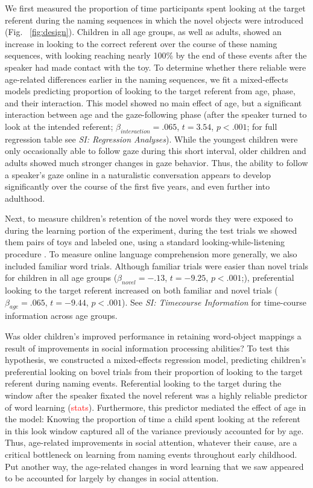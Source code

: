 \documentclass{pnastwo}
\newcommand{\red}[1]{\textcolor{red}{#1}}
\begin{document}
\begin{article}
We first measured the proportion of time participants spent looking at the target referent during the naming sequences in which the novel objects were introduced (Fig. ~\ref{fig:design}). Children in all age groups, as well as adults, showed an increase in looking to the correct referent over the course of these naming sequences, with looking reaching nearly 100\% by the end of these events after the speaker had made contact with the toy. To determine whether there reliable were age-related differences earlier in the naming sequences, we fit a mixed-effects models predicting proportion of looking to the target referent from age, phase, and their interaction. This model showed no main effect of age, but a significant interaction between age and the gaze-following phase (after the speaker turned to look at the intended referent; $\beta_{interaction} = .065$, $t = 3.54$, $p <.001$; for full regression table see \emph{SI: Regression Analyses}). While the youngest children were only occasionally able to follow gaze during this short interval, older children and adults showed much stronger changes in gaze behavior. Thus, the ability to follow a speaker's gaze online in a naturalistic conversation appears to develop significantly over the course of the first five years, and even further into adulthood.

Next, to measure children's retention of the novel words they were exposed to during the learning portion of the experiment, during the test trials we showed them pairs of toys and labeled one, using a standard looking-while-listening procedure \cite{fernald1998,fernald2008}. To measure online language comprehension more generally, we also included familiar word trials. Although familiar trials were easier than novel trials for children in all age groups ($\beta_{novel} = -.13$, $t = -9.25$, $p <.001$;), preferential looking to the target referent increased on both familiar and novel trials ($\beta_{age} = .065$, $t = -9.44$, $p <.001$). See \emph{SI: Timecourse Information} for time-course information across age groups. 

Was older children's improved performance in retaining word-object mappings a result of improvements in social information processing abilities? To test this hypothesis, we constructed a mixed-effects regression model, predicting children's preferential looking on bovel trials from their proportion of looking to the target referent during naming events. Referential looking to the target during the window after the speaker fixated the novel referent was a highly reliable predictor of word learning (\red{stats}). Furthermore, this predictor mediated the effect of age in the model: Knowing the proportion of time a child spent looking at the referent in this look window captured all of the variance previously accounted for by age. Thus, age-related improvements in social attention, whatever their cause, are a critical bottleneck on learning from naming events throughout early childhood. Put another way, the age-related changes in word learning that we saw appeared to be accounted for largely by changes in social attention.


\end{article}
\end{document}
